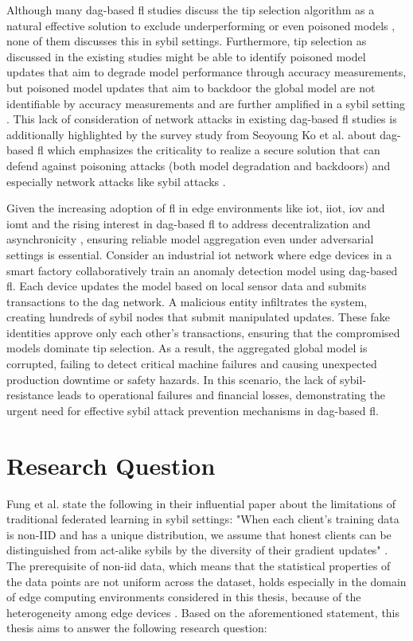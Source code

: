 Although many \ac{dag}-based \ac{fl} studies discuss the tip selection algorithm as a natural effective solution to exclude underperforming or even poisoned models \cite{cao_dag-fl_2021} \cite{cao_toward_2023} \cite{yuan_chainsfl_2021}, none of them discusses this in sybil settings. Furthermore, tip selection as discussed in the existing studies might be able to identify poisoned model updates that aim to degrade model performance through accuracy measurements, but poisoned model updates that aim to backdoor the global model are not identifiable by accuracy measurements and are further amplified in a sybil setting \cite{andreina_baffle_2021} \cite{rodriguez-barroso_dynamic_2022}. This lack of consideration of network attacks in existing \ac{dag}-based \ac{fl} studies is additionally highlighted by the survey study from Seoyoung Ko et al. about \ac{dag}-based \ac{fl} which emphasizes the criticality to realize a secure solution that can defend against poisoning attacks (both model degradation and backdoors) and especially network attacks like sybil attacks \cite{ko_asynchronous_2023}.

Given the increasing adoption of \ac{fl} in edge environments like \ac{iot}, \ac{iiot}, \ac{iov} and \ac{iomt} \cite{zhang_survey_2021} \cite{li_survey_2023}
and the rising interest in \ac{dag}-based \ac{fl} to address decentralization and asynchronicity \cite{ko_asynchronous_2023}, ensuring reliable model aggregation even under adversarial settings is essential. Consider an industrial \ac{iot} network where edge devices in a smart factory collaboratively train an anomaly detection model using \ac{dag}-based \ac{fl}. Each device updates the model based on local sensor data and submits transactions to the \ac{dag} network. A malicious entity infiltrates the system, creating hundreds of sybil nodes that submit manipulated updates. These fake identities approve only each other’s transactions, ensuring that the compromised models dominate tip selection. As a result, the aggregated global model is corrupted, failing to detect critical machine failures and causing unexpected production downtime or safety hazards. In this scenario, the lack of sybil-resistance leads to operational failures and financial losses, demonstrating the urgent need for effective sybil attack prevention mechanisms in \ac{dag}-based \ac{fl}.

\section{Research Question}
Fung et al. state the following in their influential paper about the limitations of traditional federated learning in sybil settings:
"When each client’s training data is non-IID and has a unique distribution, we assume that honest clients can be distinguished from act-alike sybils by the diversity of their gradient updates" \cite{fung_limitations_2020}. The prerequisite of \ac{non-iid} data, which means that the statistical properties of the data points are not uniform across the dataset, holds especially in the domain of edge computing environments considered in this thesis, because of the heterogeneity among edge devices \cite{lu_federated_2024}. Based on the aforementioned statement, this thesis aims to answer the following research question:

